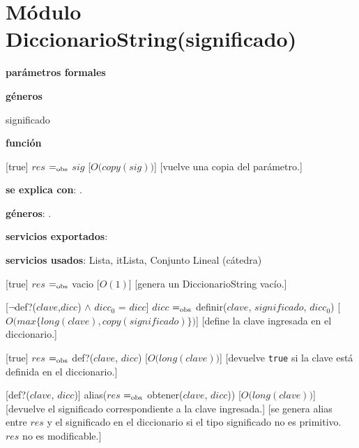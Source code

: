 \section{Módulo DiccionarioString(significado)}

\begin{Interfaz}

  \textbf{parámetros formales}\parindent\\
  \parbox{1.7cm}{\textbf{géneros}} significado\\
  \parbox[t]{1.7cm}{\textbf{función}}\parbox[t]{\textwidth-2\parindent-1.7cm}{%
    [true]
    {$res$ $=_{\mathrm{obs}}$ $sig$}
    [$O\big(copy(sig)\big)$]
    [vuelve una copia del parámetro.]
  }

  \textbf{se explica con}: .

  \textbf{géneros}: .

  \textbf{servicios exportados}: 

  \textbf{servicios usados}\parindent : Lista, itLista, Conjunto Lineal (cátedra) \\

  \textbf{}


  [true]
  {$res$ $=_{\mathrm{obs}}$ vacio}
  [$O(1)$]
  [genera un DiccionarioString vacío.]

  [$\neg$def?($clave$,$dicc$) $\land$ $dicc_0$ = $dicc$]
  {$dicc$ $=_{\mathrm{obs}}$ definir($clave$, $significado$, $dicc_0$)}
  [$O\big(max\{long(clave), copy(significado)\}\big)$]
  [define la clave ingresada en el diccionario.]

  [true]
  {$res$ $=_{\mathrm{obs}}$ def?($clave$, $dicc$)}
  [$O\big(long(clave)\big)$]
  [devuelve \texttt{true} si la clave está definida en el diccionario.]

  [def?($clave$, $dicc$)]
  {alias\big($res$ $=_{\mathrm{obs}}$ obtener($clave$, $dicc$)\big)}
  [$O\big(long(clave)\big)$]
  [devuelve el significado correspondiente a la clave ingresada.]
  [se genera alias entre $res$ y el significado en el diccionario si el tipo significado no es primitivo. $res$ no es modificable.]


\end{Interfaz}
